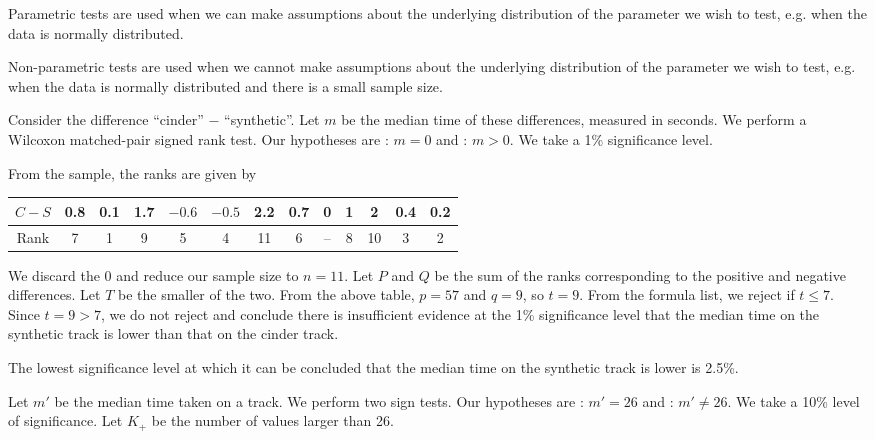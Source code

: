 \begin{solution}
    \begin{ppart}
        Parametric tests are used when we can make assumptions about the underlying distribution of the parameter we wish to test, e.g. when the data is normally distributed.
    \end{ppart}
    \begin{ppart}
        Non-parametric tests are used when we cannot make assumptions about the underlying distribution of the parameter we wish to test, e.g. when the data is normally distributed and there is a small sample size.
    \end{ppart}
    \begin{ppart}
        Consider the difference ``cinder'' $-$ ``synthetic''. Let $m$ be the median time of these differences, measured in seconds. We perform a Wilcoxon matched-pair signed rank test. Our hypotheses are \nullhyp: $m = 0$ and \althyp: $m > 0$. We take a 1\% significance level.

        From the sample, the ranks are given by
        \begin{table}[H]
            \centering
            \begin{tabular}{|c|c|c|c|c|c|c|c|c|c|c|c|c|}
            \hline
            $C - S$ & 0.8 & 0.1 & 1.7 & $-0.6$ & $-0.5$ & 2.2 & 0.7 & 0 & 1 & 2 & 0.4 & 0.2 \\ \hline
            Rank & 7 & 1 & 9 & 5 & 4 & 11 & 6 & -- & 8 & 10 & 3 & 2 \\ \hline
            \end{tabular}
        \end{table}
        We discard the 0 and reduce our sample size to $n = 11$. Let $P$ and $Q$ be the sum of the ranks corresponding to the positive and negative differences. Let $T$ be the smaller of the two. From the above table, $p = 57$ and $q = 9$, so $t = 9$. From the formula list, we reject \nullhyp{} if $t \leq 7$. Since $t = 9 > 7$, we do not reject \nullhyp{} and conclude there is insufficient evidence at the 1\% significance level that the median time on the synthetic track is lower than that on the cinder track.

        The lowest significance level at which it can be concluded that the median time on the synthetic track is lower is 2.5\%.
    \end{ppart}
    \begin{ppart}
        Let $m'$ be the median time taken on a track. We perform two sign tests. Our hypotheses are \nullhyp: $m' = 26$ and \althyp: $m' \neq 26$. We take a 10\% level of significance. Let $K_+$ be the number of values larger than 26.


\end{ppart}
\end{solution}
